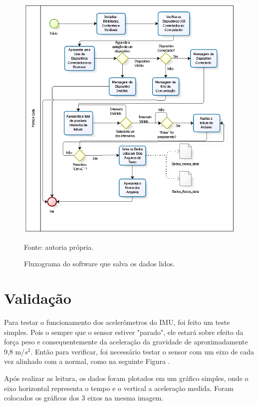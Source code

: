 		
 
		\begin{figure}[h]
			\centering
			\includegraphics[keepaspectratio=true,scale=1]{figuras/diagrama_python.PNG}
			\caption{Fluxograma do software que salva os dados lidos. }
			Fonte: autoria própria. 
			\label{fluxograma_python}	
		\end{figure}
		
\section {Validação}

	Para testar o funcionamento dos acelerômetros do IMU, foi feito um teste simples. Pois o sempre que o sensor estiver "parado", ele estará sobre efeito da força peso e consequentemente da aceleração da gravidade de aproximadamente 9,8 m/$ s^2 $. Então para verificar, foi necessário testar o sensor com um eixo de cada vez alinhado com a normal, como na seguinte Figura .
	
	Após realizar as leitura, os dados foram plotados em um gráfico simples, onde o eixo horizontal representa o tempo e o vertical a aceleração medida. Foram colocados os gráficos dos 3 eixos na mesma imagem. 
	
